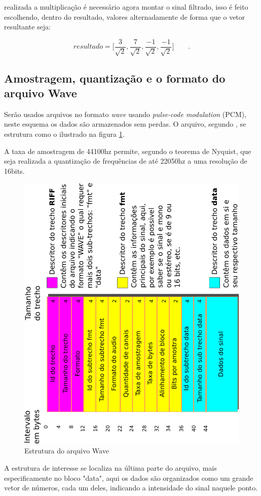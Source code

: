 \documentclass[a4paper,12pt,openright,oneside]{book}
\newenvironment{myenv}[1]
  {\begin{spacing}{#1}}
  {\end{spacing}}
\begin{document}
\begin{myenv}{1.5}
				\par realizada a multiplicação é necessário agora montar o sinal filtrado, isso é feito escolhendo, dentro do resultado, valores alternadamente de forma que o vetor resultante seja:

				\begin{equation}
					resultado = \Big[
					\frac{3}{\sqrt{2}},
					\frac{7}{\sqrt{2}},
					\frac{-1}{\sqrt{2}},
					\frac{-1}{\sqrt{2}}
					\Big]\qquad.
				\end{equation}
			
				\subsection{Amostragem, quantização e o formato do arquivo Wave}
					\par Serão usados arquivos no formato \textit{wave} usando \textit{pulse-code modulation} (PCM), neste esquema os dados são armazenados sem perdas. O arquivo, segundo \cite{WAVE2019}, se estrutura como o ilustrado na figura \ref{fig:wavePcmStructure}.
					
					\par A taxa de amostragem de 44100hz permite, segundo o teorema de Nyquist, que seja realizada a quantização de frequências de até 22050hz a uma resolução de 16bits.
				
					\begin{figure}[h]
						\centering
						\includegraphics[width=0.45\linewidth, angle=-90]{images/wavePcmStructure.pdf}
						\caption{Estrutura do arquivo Wave}
						\label{fig:wavePcmStructure}
					\end{figure}
					
					\par A estrutura de interesse se localiza na última parte do arquivo, mais especificamente no bloco "data", aqui os dados são organizados como um grande vetor de números, cada um deles, indicando a intensidade do sinal naquele ponto.

\end{myenv}
\end{document}
